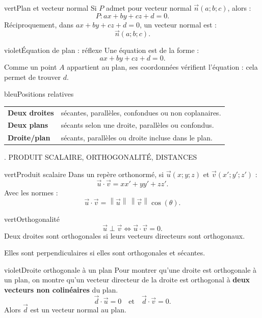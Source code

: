 \documentclass[11pt,a4paper]{article}
\newcommand{\vu}{\vec u}
\newcommand{\vv}{\vec v}
\newcommand{\vn}{\vec n}
\newcommand{\vd}{\vec d}
\newcommand{\norme}[1]{\left\lVert #1\right\rVert}
\newcommand{\ps}{\cdot}
\newcommand{\tagcol}[2]{%
\begin{tcolorbox}[
    enhanced,
    colback=#1!11,
    colframe=#1!45!black,
    boxrule=0.42pt,
    arc=2.2mm,
    left=1mm,right=1mm,top=0.55mm,bottom=0.55mm,
    before skip=0mm,
    after skip=1mm,
    fontupper=\bfseries\small,
    colupper=#1!55!black
]
\centering #2
\end{tcolorbox}}
\begin{document}
\begin{landscape}
\begin{minipage}[t]{0.318\linewidth}
\begin{fichebox}{vert}{Plan et vecteur normal}
Si $P$ admet pour vecteur normal $\vn(a;b;c)$, alors :
\[
P: ax+by+cz+d=0.
\]
Réciproquement, dans $ax+by+cz+d=0$, un vecteur normal est :
\[
\vn(a;b;c).
\]
\end{fichebox}

\begin{fichebox}{violet}{Équation de plan : réflexe}
Une équation est de la forme :
\[
ax+by+cz+d=0.
\]
Comme un point $A$ appartient au plan, ses coordonnées vérifient l'équation : cela permet de trouver $d$.
\end{fichebox}

\begin{fichebox}{bleu}{Positions relatives}
\begin{tabularx}{\linewidth}{>{\bfseries}l X}
Deux droites & sécantes, parallèles, confondues ou non coplanaires.\\
Deux plans & sécants selon une droite, parallèles ou confondus.\\
Droite/plan & sécants, parallèles ou droite incluse dans le plan.
\end{tabularx}
\end{fichebox}

\end{minipage}
\hfill
\begin{minipage}[t]{0.318\linewidth}
\tagcol{violet}{3. PRODUIT SCALAIRE, ORTHOGONALITÉ, DISTANCES}

\begin{fichebox}{vert}{Produit scalaire}
Dans un repère orthonormé, si $\vu(x;y;z)$ et $\vv(x';y';z')$ :
\[
\vu\ps\vv=xx'+yy'+zz'.
\]
Avec les normes :
\[
\vu\ps\vv=\norme{\vu}\,\norme{\vv}\cos(\theta).
\]
\end{fichebox}

\begin{fichebox}{vert}{Orthogonalité}
\[
\vu\perp \vv \iff \vu\ps\vv=0.
\]
Deux droites sont orthogonales si leurs vecteurs directeurs sont orthogonaux.

\medskip
Elles sont perpendiculaires si elles sont orthogonales et sécantes.
\end{fichebox}

\begin{fichebox}{violet}{Droite orthogonale à un plan}
Pour montrer qu'une droite est orthogonale à un plan, on montre qu'un vecteur directeur de la droite est orthogonal à \textbf{deux vecteurs non colinéaires} du plan.
\[
\vd\ps\vu=0 \quad\text{et}\quad \vd\ps\vv=0.
\]
Alors $\vd$ est un vecteur normal au plan.
\end{fichebox}


\end{minipage}
\end{landscape}
\end{document}
